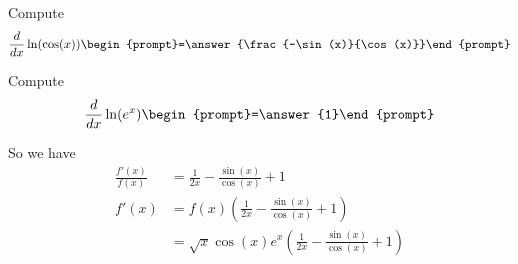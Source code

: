 \documentclass{ximera}
\begin{document}
\begin{problem}
  Compute %
  \[
  \frac{d}{dx} \ln(\cos(x))  \begin{prompt}=\answer{\frac{-\sin(x)}{\cos(x)}}\end{prompt}
  \]
\end{problem}

\begin{problem}
  Compute %
  \[
  \frac{d}{dx} \ln(e^x)  \begin{prompt}=\answer{1}\end{prompt}
  \]
\end{problem}

So we have
\begin{align*}
  \frac{f'(x)}{f(x)} &= \frac{1}{2x} - \frac{\sin(x)}{\cos(x)} + 1\\
  f'(x) &= f(x) \left(\frac{1}{2x} - \frac{\sin(x)}{\cos(x)} + 1\right)\\
  &= \sqrt{x}\cos(x)e^x\left(\frac{1}{2x} - \frac{\sin(x)}{\cos(x)} + 1\right)
\end{align*}



%
\end{document}
